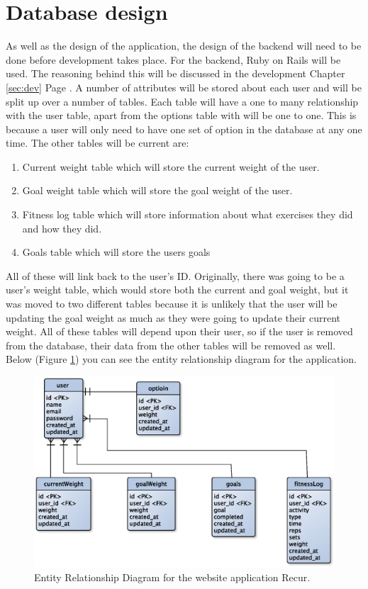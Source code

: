 \section{Database design}
As well as the design of the application, the design of the backend will need to be done before development takes place. For the backend, Ruby on Rails \citep{rails:2013} will be used. The reasoning behind this will be discussed in the development Chapter \ref{sec:dev} Page \pageref{sec:dev}. A number of attributes will be stored about each user and will be split up over a number of tables. Each table will have a one to many relationship with the user table, apart from the options table with will be one to one. This is because a user will only need to have one set of option in the database at any one time. The other tables will be current are:

\begin{enumerate}
\item Current weight table which will store the current weight of the user.
\item Goal weight table which will store the goal weight of the user.
\item Fitness log table which will store information about what exercises they did and how they did.
\item Goals table which will store the users goals
\end{enumerate}

\noindent
All of these will link back to the user's ID. Originally, there was going to be a user's weight table, which would store both the current and goal weight, but it was moved to two different tables because it is unlikely that the user will be updating the goal weight as much as they were going to update their current weight. All of these tables will depend upon their user, so if the user is removed from the database, their data from the other tables will be removed as well. Below (Figure \ref{fig:erd}) you can see the entity relationship diagram for the application.

\begin{figure}[!ht]
\centering
\includegraphics[scale=0.5]{chapters/figs/erd}
\caption{Entity Relationship Diagram for the website application Recur.}
\label{fig:erd}
\end{figure}

